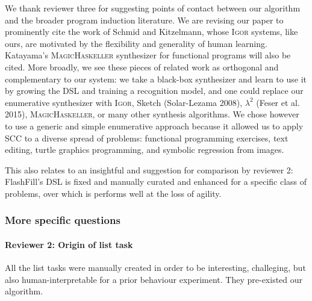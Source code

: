 \documentclass{article}
\begin{document}
We thank reviewer three for suggesting points of contact between our algorithm and the broader program induction literature.
We are revising our paper to prominently cite the work of Schmid and Kitzelmann,
whose \textsc{Igor} systems, like ours,
are motivated by the flexibility and generality of human learning.
Katayama's \textsc{MagicHaskeller} synthesizer for functional programs will also be cited.
More broadly,
we see these pieces of related work as
orthogonal and complementary to
our system:
we take a black-box synthesizer and
learn to use it by growing the DSL and
training a recognition model,
and one could replace our enumerative synthesizer with
\textsc{Igor}, Sketch (Solar-Lezama 2008), $\lambda^2$ (Feser et al. 2015), \textsc{MagicHaskeller},
or many other synthesis algorithms.
We chose however to
use a generic and simple enumerative approach because it allowed us to apply SCC
to a diverse spread of problems: functional programming exercises, text editing,
turtle graphics programming, and symbolic regression from images.



This also relates to an insightful
and suggestion for comparison by reviewer 2: FlashFill's DSL is fixed and
manually curated and enhanced for a specific class of problems, over which is
performs well at the loss of agility.


\subsubsection*{More specific questions}

\paragraph*{Reviewer 2: Origin of list task} All the list tasks were manually
created in order to be interesting, challeging, but also human-interpretable for
a prior behaviour experiment. They pre-existed our algorithm.
\end{document}
